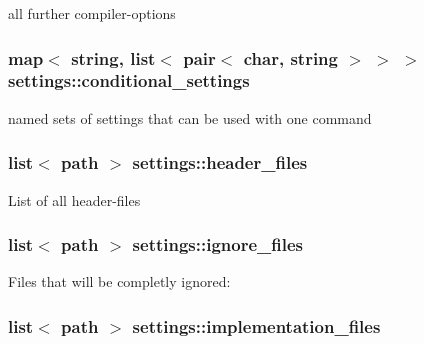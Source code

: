 all further compiler-\/options \hypertarget{structsettings_ac27735f1d33fb886c326a795d4368994}{
\subsubsection[{conditional\-\_\-settings}]{\setlength{\rightskip}{0pt plus 5cm}map$<$ string, list$<$ pair$<$ char, string $>$ $>$ $>$ settings\-::conditional\-\_\-settings\hspace{0.3cm}{\ttfamily [static]}}}\label{structsettings_ac27735f1d33fb886c326a795d4368994}
named sets of settings that can be used with one command \hypertarget{structsettings_ab910724468ff0119dcb5fec1399eac9f}{
\subsubsection[{header\-\_\-files}]{\setlength{\rightskip}{0pt plus 5cm}list$<$ path $>$ settings\-::header\-\_\-files\hspace{0.3cm}{\ttfamily [static]}}}\label{structsettings_ab910724468ff0119dcb5fec1399eac9f}
List of all header-\/files \hypertarget{structsettings_aff7f8f80b30749135c089741a4e07b0c}{
\subsubsection[{ignore\-\_\-files}]{\setlength{\rightskip}{0pt plus 5cm}list$<$ path $>$ settings\-::ignore\-\_\-files\hspace{0.3cm}{\ttfamily [static]}}}\label{structsettings_aff7f8f80b30749135c089741a4e07b0c}
Files that will be completly ignored\-: \hypertarget{structsettings_aca3dbe12e7356fd1470e358838053b11}{
\subsubsection[{implementation\-\_\-files}]{\setlength{\rightskip}{0pt plus 5cm}list$<$ path $>$ settings\-::implementation\-\_\-files\hspace{0.3cm}{\ttfamily [static]}}}\label{structsettings_aca3dbe12e7356fd1470e358838053b11}
